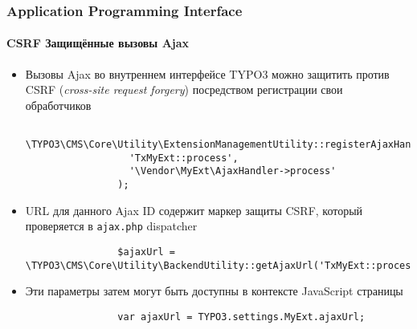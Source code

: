 \begin{frame}[fragile]
	\frametitle{Application Programming Interface}
	\framesubtitle{CSRF Защищённые вызовы Ajax}

	\lstset{
		basicstyle=\tiny\ttfamily
	}

	\begin{itemize}
		\item Вызовы Ajax во внутреннем интерфейсе TYPO3 можно защитить против CSRF (\textit{cross-site request forgery}) посредством регистрации свои обработчиков

			\begin{lstlisting}
				\TYPO3\CMS\Core\Utility\ExtensionManagementUtility::registerAjaxHandler(
				  'TxMyExt::process',
				  '\Vendor\MyExt\AjaxHandler->process'
				);
			\end{lstlisting}

		\item URL для данного Ajax ID содержит маркер защиты CSRF, который проверяется в \texttt{ajax.php}
		dispatcher

			\begin{lstlisting}
				$ajaxUrl = \TYPO3\CMS\Core\Utility\BackendUtility::getAjaxUrl('TxMyExt::process');
			\end{lstlisting}

		\item Эти параметры затем могут быть доступны в контексте JavaScript страницы

			\begin{lstlisting}
				var ajaxUrl = TYPO3.settings.MyExt.ajaxUrl;
			\end{lstlisting}

	\end{itemize}

\end{frame}


